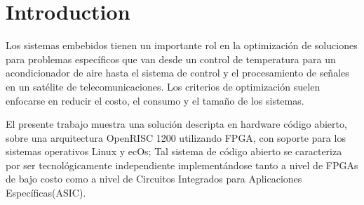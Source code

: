 \documentclass[conference]{IEEEtran}
\begin{document}




%
\IEEEpeerreviewmaketitle



\section{Introduction} \label{sec:intro}


Los sistemas embebidos tienen un importante rol en la optimización de soluciones para problemas específicos que van desde un control de temperatura para un acondicionador de aire hasta el sistema de control y el procesamiento de señales en un satélite de
telecomunicaciones. Los criterios de optimización suelen enfocarse en reducir el costo, el consumo y el tamaño de los sistemas.

El presente trabajo muestra una solución descripta en hardware código abierto, sobre una arquitectura OpenRISC 1200 utilizando FPGA, con soporte para los sistemas operativos Linux y ecOs; Tal sistema de código abierto se caracteriza por ser tecnológicamente independiente implementándose tanto a nivel de FPGAs de bajo costo como a nivel de Circuitos Integrados para Aplicaciones Específicas(ASIC).
\end{document}

